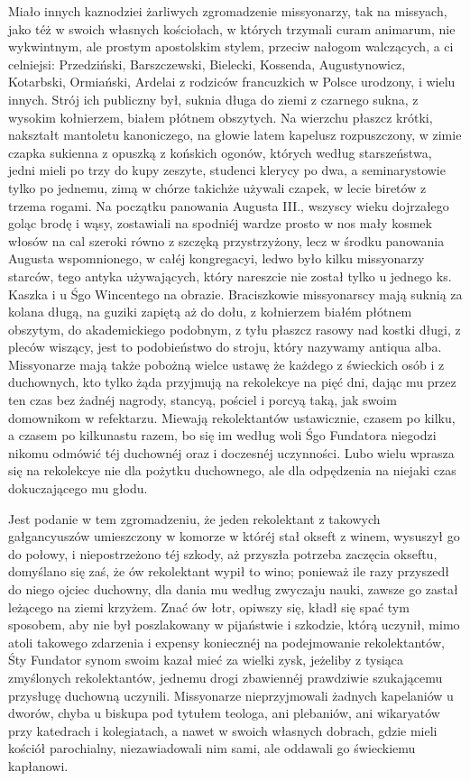 \documentclass{book}
\begin{document}
Miało innych kaznodziei żarliwych zgromadzenie missyonarzy, tak na missyach, jako téż w swoich własnych kościołach, w których trzymali curam animarum, nie wykwintnym, ale prostym apostolskim stylem, przeciw nałogom walczących, a ci celniejsi: Przedziński, Barszczewski, Bielecki, Kossenda, Augustynowicz, Kotarbski, Ormiański, Ardelai z rodziców francuzkich w Polsce urodzony, i wielu innych. Strój ich publiczny był, suknia długa do ziemi z czarnego sukna, z wysokim kołnierzem, białem płótnem obszytych. Na wierzchu płaszcz krótki, nakształt mantoletu kanoniczego, na głowie latem kapelusz rozpuszczony, w zimie czapka sukienna z opuszką z końskich ogonów, których według starszeństwa, jedni mieli po trzy do kupy zeszyte, studenci klerycy po dwa, a seminarystowie tylko po jednemu, zimą w chórze takichże używali czapek, w lecie biretów z trzema rogami. Na początku panowania Augusta III., wszyscy wieku dojrzałego goląc brodę i wąsy, zostawiali na spodniéj wardze prosto w nos mały kosmek włosów na cal szeroki równo z szczęką przystrzyżony, lecz w środku panowania Augusta wspomnionego, w całéj kongregacyi, ledwo było kilku missyonarzy starców, tego antyka używających, który nareszcie nie został tylko u jednego ks. Kaszka i u Śgo Wincentego na obrazie. Braciszkowie missyonarscy mają suknią za kolana długą, na guziki zapiętą aż do dołu, z kołnierzem białém płótnem obszytym, do akademickiego podobnym, z tyłu płaszcz rasowy nad kostki długi, z pleców wiszący, jest to podobieństwo do stroju, który nazywamy antiqua alba. Missyonarze mają także pobożną wielce ustawę że każdego z świeckich osób i z duchownych, kto tylko żąda przyjmują na rekolekcye na pięć dni, dając mu przez ten czas bez żadnéj nagrody, stancyą, pościel i porcyą taką, jak swoim domownikom w refektarzu. Miewają rekolektantów ustawicznie, czasem po kilku, a czasem po kilkunastu razem, bo się im według woli Śgo Fundatora niegodzi nikomu odmówić téj duchownéj oraz i doczesnéj uczynności. Lubo wielu wprasza się na rekolekcye nie dla pożytku duchownego, ale dla odpędzenia na niejaki czas dokuczającego mu głodu.

Jest podanie w tem zgromadzeniu, że jeden rekolektant z takowych gałgancyuszów umieszczony w komorze w któréj stał okseft z winem, wysuszył go do połowy, i niepostrzeżono téj szkody, aż przyszła potrzeba zaczęcia okseftu, domyślano się zaś, że ów rekolektant wypił to wino; ponieważ ile razy przyszedł do niego ojciec duchowny, dla dania mu według zwyczaju nauki, zawsze go zastał leżącego na ziemi krzyżem. Znać ów łotr, opiwszy się, kładł się spać tym sposobem, aby nie był poszlakowany w pijaństwie i szkodzie, którą uczynił, mimo atoli takowego zdarzenia i expensy koniecznéj na podejmowanie rekolektantów, Śty Fundator synom swoim kazał mieć za wielki zysk, jeżeliby z tysiąca zmyślonych rekolektantów, jednemu drogi zbawiennéj prawdziwie szukającemu przysługę duchowną uczynili. Missyonarze nieprzyjmowali żadnych kapelaniów u dworów, chyba u biskupa pod tytułem teologa, ani plebaniów, ani wikaryatów przy katedrach i kolegiatach, a nawet w swoich własnych dobrach, gdzie mieli kościół parochialny, niezawiadowali nim sami, ale oddawali go świeckiemu kapłanowi.
\end{document}
